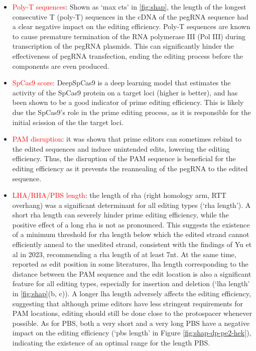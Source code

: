 \begin{itemize}[itemsep=-0mm]
    \item \textcolor{red}{Poly-T sequences}: Shown as `max cts' in \autoref{fig:shap}, the length of the longest consecutive T (poly-T) sequences in the cDNA of the pegRNA sequence had a clear negative impact on the editing efficiency. Poly-T sequences are known to cause premature termination of the RNA polymerase III (Pol III) during transcription of the pegRNA plasmids\cite{nielsenMechanismEukaryoticRNA2013}. This can significantly hinder the effectiveness of pegRNA transfection, ending the editing process before the components are even produced.
    \item \textcolor{red}{SpCas9 score}: DeepSpCas9 is a deep learning model that estimates the activity of the SpCas9 protein on a target loci (higher is better), and has been shown to be a good indicator of prime editing efficiency\cite{kimPredictingEfficiencyPrime2021}. This is likely due the SpCas9's role in the prime editing process, as it is responsible for the initial scission of the the target loci. 
    \item \textcolor{red}{PAM disruption}: it was shown that prime editors can sometimes rebind to the edited sequences and induce unintended edits, lowering the editing efficiency\cite{liudavidr.SearchandreplaceGenomeEditing2019}. Thus, the disruption of the PAM sequence is beneficial for the editing efficiency as it prevents the reannealing of the pegRNA to the edited sequence. 
    \item \textcolor{red}{LHA/RHA/PBS length}: the length of rha (right homology arm, RTT overhang) was a significant determinant for all editing types (`rha length'). A short rha length can severely hinder prime editing efficiency, while the positive effect of a long rha is not as pronounced. This suggests the existence of a minimum threshold for rha length below which the edited strand cannot efficiently anneal to the unedited strand, consistent with the findings of Yu et al in 2023, recommending a rha length of at least 7nt\cite{yuPredictionEfficienciesDiverse2023}. At the same time, reported as edit position in some literatures, lha length corresponding to the distance between the PAM sequence and the edit location is also a significant feature for all editing types, especially for insertion and deletion (`lha length' in \autoref{fig:shap}(b, c)). A longer lha length adversely affects the editing efficiency, suggesting that although prime editors have less stringent requirements for PAM locations, editing should still be done close to the protospacer whenever possible. As for PBS, both a very short and a very long PBS have a negative impact on the editing efficiency (`pbs length' in Figure \ref{fig:shap-dp-pe2-hek}), indicating the existence of an optimal range for the length PBS.

\end{itemize}
